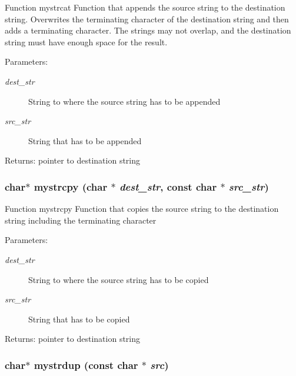 Function mystrcat Function that appends the source string to the destination string. Overwrites the terminating character of the destination string and then adds a terminating character. The strings may not overlap, and the destination string must have enough space for the result. \begin{Desc}
\item[Parameters:]
\begin{description}
\item[{\em dest\_\-str}]String to where the source string has to be appended \item[{\em src\_\-str}]String that has to be appended \end{description}
\end{Desc}
\begin{Desc}
\item[Returns:]pointer to destination string \end{Desc}
\subsubsection{\setlength{\rightskip}{0pt plus 5cm}char$\ast$ mystrcpy (char $\ast$ {\em dest\_\-str}, const char $\ast$ {\em src\_\-str})}\label{mystring_8c_4ca137dfdc47bfb151a5263f25710227}


Function mystrcpy Function that copies the source string to the destination string including the terminating character \begin{Desc}
\item[Parameters:]
\begin{description}
\item[{\em dest\_\-str}]String to where the source string has to be copied \item[{\em src\_\-str}]String that has to be copied \end{description}
\end{Desc}
\begin{Desc}
\item[Returns:]pointer to destination string \end{Desc}
\subsubsection{\setlength{\rightskip}{0pt plus 5cm}char$\ast$ mystrdup (const char $\ast$ {\em src})}\label{mystring_8c_e4d69f24eeedc25d4a7abe09f6656cc2}


